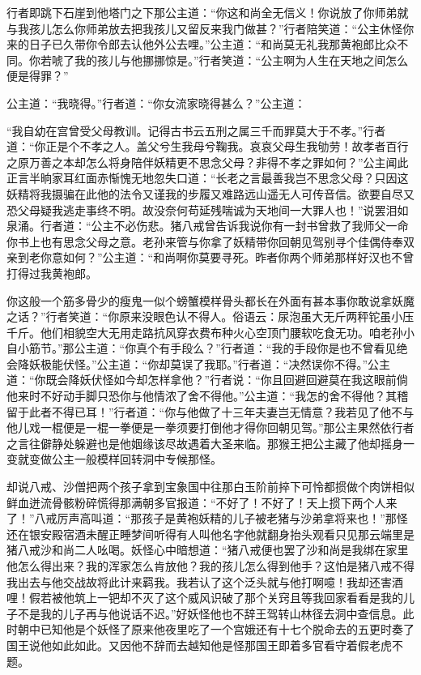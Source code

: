 \documentclass[12pt,UTF8]{ctexbook}
\begin{document}
{行者即跳下石崖到他塔门之下那公主道：“你这和尚全无信义！你说放了你师弟就与我孩儿怎么你师弟放去把我孩儿又留反来我门做甚？”行者陪笑道：“公主休怪你来的日子已久带你令郎去认他外公去哩。”公主道：“和尚莫无礼我那黄袍郎比众不同。你若唬了我的孩儿与他挪挪惊是。”行者笑道：“公主啊为人生在天地之间怎么便是得罪？”

公主道：“我晓得。”行者道：“你女流家晓得甚么？”公主道：

“我自幼在宫曾受父母教训。记得古书云五刑之属三千而罪莫大于不孝。”行者道：“你正是个不孝之人。盖父兮生我母兮鞠我。哀哀父母生我劬劳！故孝者百行之原万善之本却怎么将身陪伴妖精更不思念父母？非得不孝之罪如何？”公主闻此正言半晌家耳红面赤惭愧无地忽失口道：“长老之言最善我岂不思念父母？只因这妖精将我摄骗在此他的法令又谨我的步履又难路远山遥无人可传音信。欲要自尽又恐父母疑我逃走事终不明。故没奈何苟延残喘诚为天地间一大罪人也！”说罢泪如泉涌。行者道：“公主不必伤悲。猪八戒曾告诉我说你有一封书曾救了我师父一命你书上也有思念父母之意。老孙来管与你拿了妖精带你回朝见驾别寻个佳偶侍奉双亲到老你意如何？”公主道：“和尚啊你莫要寻死。昨者你两个师弟那样好汉也不曾打得过我黄袍郎。

你这般一个筋多骨少的瘦鬼一似个螃蟹模样骨头都长在外面有甚本事你敢说拿妖魔之话？”行者笑道：“你原来没眼色认不得人。俗语云：尿泡虽大无斤两秤铊虽小压千斤。他们相貌空大无用走路抗风穿衣费布种火心空顶门腰软吃食无功。咱老孙小自小筋节。”那公主道：“你真个有手段么？”行者道：“我的手段你是也不曾看见绝会降妖极能伏怪。”公主道：“你却莫误了我耶。”行者道：“决然误你不得。”公主道：“你既会降妖伏怪如今却怎样拿他？”行者说：“你且回避回避莫在我这眼前倘他来时不好动手脚只恐你与他情浓了舍不得他。”公主道：“我怎的舍不得他？其稽留于此者不得已耳！”行者道：“你与他做了十三年夫妻岂无情意？我若见了他不与他儿戏一棍便是一棍一拳便是一拳须要打倒他才得你回朝见驾。”那公主果然依行者之言往僻静处躲避也是他姻缘该尽故遇着大圣来临。那猴王把公主藏了他却摇身一变就变做公主一般模样回转洞中专候那怪。

却说八戒、沙僧把两个孩子拿到宝象国中往那白玉阶前捽下可怜都掼做个肉饼相似鲜血迸流骨骸粉碎慌得那满朝多官报道：“不好了！不好了！天上掼下两个人来了！”八戒厉声高叫道：“那孩子是黄袍妖精的儿子被老猪与沙弟拿将来也！”那怪还在银安殿宿酒未醒正睡梦间听得有人叫他名字他就翻身抬头观看只见那云端里是猪八戒沙和尚二人吆喝。妖怪心中暗想道：“猪八戒便也罢了沙和尚是我绑在家里他怎么得出来？我的浑家怎么肯放他？我的孩儿怎么得到他手？这怕是猪八戒不得我出去与他交战故将此计来羁我。我若认了这个泛头就与他打啊噫！我却还害酒哩！假若被他筑上一钯却不灭了这个威风识破了那个关窍且等我回家看看是我的儿子不是我的儿子再与他说话不迟。”好妖怪他也不辞王驾转山林径去洞中查信息。此时朝中已知他是个妖怪了原来他夜里吃了一个宫娥还有十七个脱命去的五更时奏了国王说他如此如此。又因他不辞而去越知他是怪那国王即着多官看守着假老虎不题。

}
\end{document}
